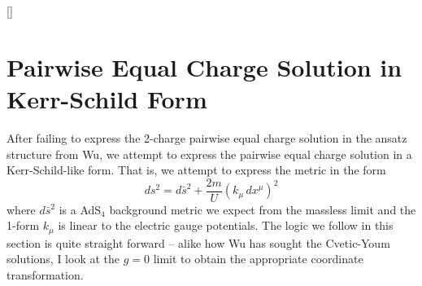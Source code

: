 
\usepackage{cancel}
\usepackage{tikz}
\usetikzlibrary{positioning}
\usetikzlibrary{shapes}
\usepackage{titlesec}
\titleformat{\section}{\Large\scshape\raggedright}{}{0em}{}[]

\title{}
\author{Dane Jeon}
\abstract{}



\section{Pairwise Equal Charge Solution in Kerr-Schild Form}
 After failing to express the 2-charge pairwise equal charge solution in the ansatz structure from Wu, we attempt to express the pairwise equal charge solution in a Kerr-Schild-like form. That is, we attempt to express the metric in the form
\[ds^2=d\bar{s}^2+\dfrac{2m}{U}(k_{\mu}\,dx^{\mu })^2\tag{1}\]
where $d\bar{s}^2$ is a AdS$_{4}$ background metric we expect from the massless limit and the 1-form $k_{\mu }$ is linear to the electric gauge potentials.
\newline
\newline
The logic we follow in this section is quite straight forward -- alike how Wu has sought the Cvetic-Youm solutions, I look at the $g= 0$ limit to obtain the appropriate coordinate transformation. 
\newline

